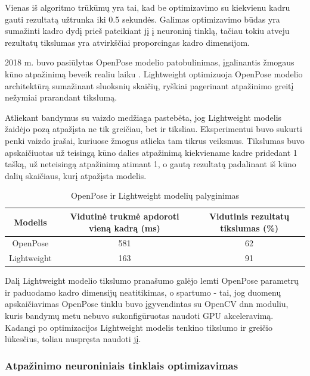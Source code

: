\documentclass{VUMIFPSbakalaurinis}
\begin{document}
Vienas iš algoritmo trūkūmų yra tai, kad be optimizavimo su kiekvienu kadru gauti rezultatą užtrunka iki 0.5 sekundės. Galimas optimizavimo būdas yra sumažinti kadro dydį prieš pateikiant jį į neuroninį tinklą, tačiau tokiu atveju rezultatų tikslumas yra atvirkščiai proporcingas kadro dimensijom. 

2018 m. buvo pasiūlytas OpenPose modelio patobulinimas, įgalinantis žmogaus kūno atpažinimą beveik realiu laiku \cite{osokin2018realtime}. Lightweight optimizuoja OpenPose modelio architektūrą sumažinant sluoksnių skaičių, ryškiai pagerinant atpažinimo greitį nežymiai prarandant tikslumą. 

Atliekant bandymus su vaizdo medžiaga pastebėta, jog Lightweight modelis žaidėjo pozą atpažįsta ne tik greičiau, bet ir tiksliau. Eksperimentui buvo sukurti penki vaizdo įrašai, kuriuose žmogus atlieka tam tikrus veiksmus. Tikslumas buvo apskaičiuotas už teisingą kūno dalies atpažinimą kiekviename kadre pridedant 1 tašką, už neteisingą atpažinimą atimant 1, o gautą rezultatą padalinant iš kūno dalių skaičiaus, kurį atpažįsta modelis.

\begin{table}[H]\footnotesize
	\centering
	\caption{OpenPose ir Lightweight modelių palyginimas}
	{\begin{tabular}{|c|c|c|} \hline
			\textbf{Modelis} & \textbf{Vidutinė trukmė apdoroti vieną kadrą (ms)} & \textbf{Vidutinis rezultatų tikslumas (\%)} \\
			\hline
			OpenPose  & 581    & 62       \\
			\hline
			Lightweight  & 163    & 91       \\
			\hline
	\end{tabular}}
	\label{tab:openposevslightweight}
\end{table}

Dalį Lightweight modelio tikslumo pranašumo galėjo lemti OpenPose parametrų ir paduodamo kadro dimensijų neatitikimas, o spartumo - tai, jog duomenų apskaičiavimas OpenPose tinklu buvo įgyvendintas su OpenCV dnn moduliu, kuris bandymų metu nebuvo sukonfigūruotas naudoti GPU akceleravimą. Kadangi po optimizacijos Lightweight modelis tenkino tikslumo ir greičio lūkesčius, toliau nuspręsta naudoti jį. 

\subsubsection{Atpažinimo neuroniniais tinklais optimizavimas}
\end{document}
